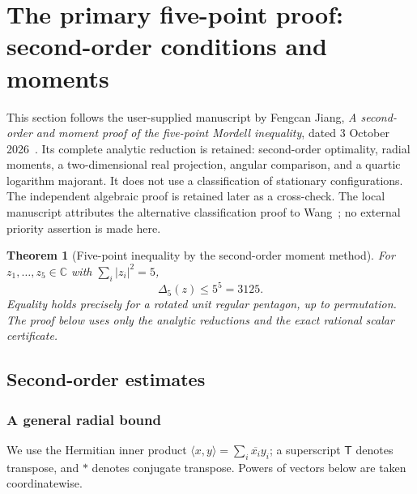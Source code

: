 \documentclass[11pt]{article}
\newtheorem{theorem}{Theorem}[section]
\theoremstyle{remark}
\newcommand{\C}{\mathbb C}
\newcommand{\ip}[2]{\langle#1,#2\rangle}
\numberwithin{equation}{section}
\begin{document}
\section{The primary five-point proof: second-order conditions and moments}
\label{sec:five-primary-moments}
This section follows the user-supplied manuscript by Fengcan Jiang,
\emph{A second-order and moment proof of the five-point Mordell inequality},
dated 3 October 2026~\cite{JiangFive}. Its complete analytic reduction is
retained: second-order optimality, radial moments, a two-dimensional real
projection, angular comparison, and a quartic logarithm majorant.
It does not use a classification of stationary configurations.
The independent algebraic proof is retained later as a cross-check.
The local manuscript attributes the alternative classification proof to
Wang~\cite{Wang}; no external priority assertion is made here.

\begin{theorem}[Five-point inequality by the second-order moment method]
\label{ref5-thm:main}
For $z_1,\ldots,z_5\in\C$ with $\sum_i|z_i|^2=5$,
\[
\Delta_5(z)\le5^5=3125.
\]
Equality holds precisely for a rotated unit regular pentagon, up to
permutation. The proof below uses only the analytic reductions and the
exact rational scalar certificate.
\end{theorem}
\subsection{Second-order estimates}
\subsubsection{A general radial bound}
We use the Hermitian inner product $\ip{x}{y}=\sum_i\overline{x_i}y_i$;
a superscript $\mathsf T$ denotes transpose, and $*$ denotes conjugate
transpose. Powers of vectors below are taken coordinatewise.
\end{document}
